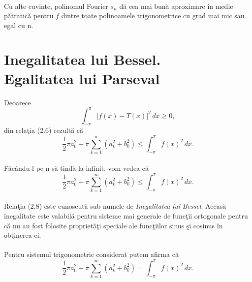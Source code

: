 \documentclass[a4paper,openany,12pt]{report}
\begin{document}
\paragraph*{}Cu alte cuvinte, polinomul Fourier $s_n$ d\u a cea mai bun\u a aproximare \^ in medie p\u atratic\u a pentru $f$ dintre toate polinoamele trigonometrice cu grad mai mic sau egal cu n.



\section{Inegalitatea lui Bessel. \\Egalitatea lui Parseval}
\paragraph*{}Deoarece 
\begin{equation*}
\int_{-\pi}^{\pi} \Big[f(x) - T(x)\Big]^2\,dx \geq 0,
\end{equation*}
din rela\c tia (2.6) rezult\u a c\u a
\begin{equation*}
\frac{1}{2}\pi a_0^2 + \pi \sum_{k=1}^{n}(a_k^2 + b_k^2) \leq \int_{-\pi}^{\pi} f(x)^2\,dx.
\end{equation*}
\paragraph*{}F\u ac\^ andu-l pe n s\u a tind\u a la infinit, vom vedea c\u a
\begin{equation}
\frac{1}{2}\pi a_0^2 + \pi \sum_{k=1}^{\infty}(a_k^2 + b_k^2) \leq \int_{-\pi}^{\pi} f(x)^2\,dx.
\end{equation}
\paragraph*{}Rela\c tia (2.8) este cunoscut\u a sub numele de \textit{Inegalitatea lui Bessel}. Aceas\u a inegalitate este valabil\u a pentru sisteme mai generale de func\c tii ortogonale pentru c\u a nu au fost folosite propriet\u a\c ti speciale ale func\c tiilor sinus \c si cosinus \^ in ob\c tinerea ei.
\paragraph*{} Pentru sistemul trigonometric considerat putem afirma c\u a
\begin{equation}
\frac{1}{2}\pi a_0^2 + \pi \sum_{k=1}^{\infty}(a_k^2 + b_k^2) = \int_{-\pi}^{\pi} f(x)^2\,dx.
\end{equation}
\end{document}
